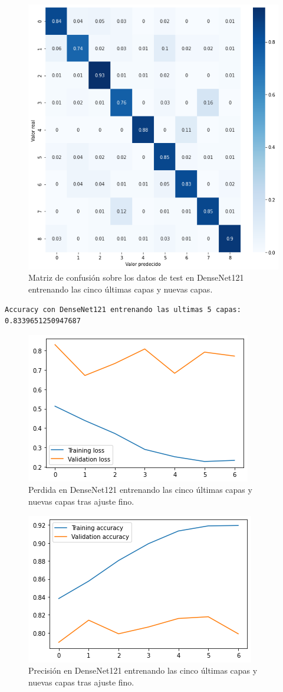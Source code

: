 \begin{figure}[H]
  \centering
  \includegraphics[width=0.5\linewidth]{Imagenes/entrenamiento_redes/5-ult/densenet_5ult_matriz.png}
  \caption{Matriz de confusión sobre los datos de test en DenseNet121 entrenando las cinco últimas capas y nuevas capas.}
\end{figure}


\begin{lstlisting}
Accuracy con DenseNet121 entrenando las ultimas 5 capas: 0.8339651250947687
\end{lstlisting}



\begin{figure}[H]
  \centering
  \includegraphics[width=0.5\linewidth]{Imagenes/entrenamiento_redes/5-ult/densenet_5fine_loss.png}
  \caption{Perdida en DenseNet121 entrenando las cinco últimas capas y nuevas capas tras ajuste fino.}
\end{figure}

\begin{figure}[H]
  \centering
  \includegraphics[width=0.5\linewidth]{Imagenes/entrenamiento_redes/5-ult/densenet_5fine_acc.png}
  \caption{Precisión en DenseNet121 entrenando las cinco últimas capas y nuevas capas tras ajuste fino.}
\end{figure}

